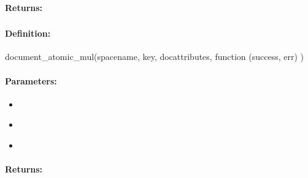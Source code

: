 \paragraph{Returns:}


\pagebreak
\subsubsection{}
\label{api:nodejs:document_atomic_mul}


\paragraph{Definition:}
\begin{javascriptcode}
document_atomic_mul(spacename, key, docattributes, function (success, err) {})
\end{javascriptcode}
\paragraph{Parameters:}
\begin{itemize}[noitemsep]
\item {}\\

\item {}\\

\item {}\\

\end{itemize}

\paragraph{Returns:}


\pagebreak
\subsubsection{}
\label{api:nodejs:document_atomic_div}


